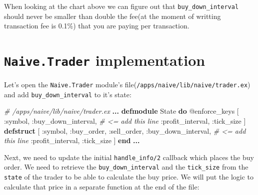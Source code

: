 \documentclass[
]{book}
\newenvironment{Shaded}{\begin{snugshade}}{\end{snugshade}}
\newcommand{\CommentTok}[1]{\textcolor[rgb]{0.56,0.35,0.01}{\textit{#1}}}
\newcommand{\ConstantTok}[1]{\textcolor[rgb]{0.00,0.00,0.00}{#1}}
\newcommand{\KeywordTok}[1]{\textcolor[rgb]{0.13,0.29,0.53}{\textbf{#1}}}
\newcommand{\NormalTok}[1]{#1}
\newcommand{\OperatorTok}[1]{\textcolor[rgb]{0.81,0.36,0.00}{\textbf{#1}}}
\newcommand{\OtherTok}[1]{\textcolor[rgb]{0.56,0.35,0.01}{#1}}
\newcommand{\VariableTok}[1]{\textcolor[rgb]{0.00,0.00,0.00}{#1}}
\begin{document}
When looking at the chart above we can figure out that \texttt{buy\_down\_interval} should never be smaller than double the fee(at the moment of writting transaction fee is 0.1\%) that you are paying per transaction.

\hypertarget{naive.trader-implementation}{%
\section{\texorpdfstring{\texttt{Naive.Trader} implementation}{Naive.Trader implementation}}\label{naive.trader-implementation}}

Let's open the \texttt{Naive.Trader} module's file(\texttt{/apps/naive/lib/naive/trader.ex}) and add \texttt{buy\_down\_interval} to it's state:

\begin{Shaded}
\begin{Highlighting}[]
  \CommentTok{\# /apps/naive/lib/naive/trader.ex}
  \OperatorTok{...}
  \KeywordTok{defmodule} \ConstantTok{State} \KeywordTok{do}
    \OtherTok{@enforce\_keys}\NormalTok{ [}
      \VariableTok{:symbol}\NormalTok{,}
      \VariableTok{:buy\_down\_interval}\NormalTok{, }\CommentTok{\# \textless{}= add this line}
      \VariableTok{:profit\_interval}\NormalTok{,}
      \VariableTok{:tick\_size}
\NormalTok{    ]}
    \KeywordTok{defstruct}\NormalTok{ [}
      \VariableTok{:symbol}\NormalTok{,}
      \VariableTok{:buy\_order}\NormalTok{,}
      \VariableTok{:sell\_order}\NormalTok{,}
      \VariableTok{:buy\_down\_interval}\NormalTok{, }\CommentTok{\# \textless{}= add this line}
      \VariableTok{:profit\_interval}\NormalTok{,}
      \VariableTok{:tick\_size}
\NormalTok{    ]}
  \KeywordTok{end}
  \OperatorTok{...}
\end{Highlighting}
\end{Shaded}

Next, we need to update the initial \texttt{handle\_info/2} callback which places the buy order. We need to retrieve the \texttt{buy\_down\_interval} and the \texttt{tick\_size} from the \texttt{state} of the trader to be able to calculate the buy price. We will put the logic to calculate that price in a separate function at the end of the file:
\end{document}
